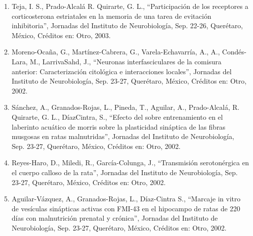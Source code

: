 \begin{enumerate}
\item Teja, I. S., Prado-Alcalá R. Quirarte, G. L., “Participación de los receptores a corticosterona estriatales en la 
memoria de una tarea de evitación inhibitoria”, Jornadas del Instituto de Neurobiología, Sep. 22-26, Querétaro, México, 
Créditos en: Otro, 2003.

\item Moreno-Ocaña, G., Martínez-Cabrera, G., Varela-Echavarría, A., A., Condés-Lara, M., LarrivaSahd, J., “Neuronas 
interfasciculares de la comisura anterior: Caracterización citológica e interacciones locales”, Jornadas del Instituto de 
Neurobiología, Sep. 23-27, Querétaro, México, Créditos en: Otro, 2002.

\item Sánchez, A., Granados-Rojas, L., Pineda, T., Aguilar, A., Prado-Alcalá, R. Quirarte, G. L., DíazCintra, S., “Efecto del 
sobre entrenamiento en el laberinto acuático de morris sobre la plasticidad sináptica de las fibras musgosas en ratas 
malnutridas”, Jornadas del Instituto de Neurobiología, Sep. 23-27, Querétaro, México, Créditos en: Otro, 2002.

\item Reyes-Haro, D., Miledi, R., García-Colunga, J., “Transmisión serotonérgica en el cuerpo calloso de la rata”, Jornadas 
del Instituto de Neurobiología, Sep. 23-27, Querétaro, México, Créditos en: Otro, 2002.

\item Aguilar-Vázquez, A., Granados-Rojas, L., Díaz-Cintra S., “Marcaje in vitro de vesículas sinápticas activas con FMI-43 
en el hipocampo de ratas de 220 días con malnutrición prenatal y crónica”, Jornadas del Instituto de Neurobiología, Sep. 
23-27, Querétaro, México, Créditos en: Otro, 2002.

\end{enumerate}
